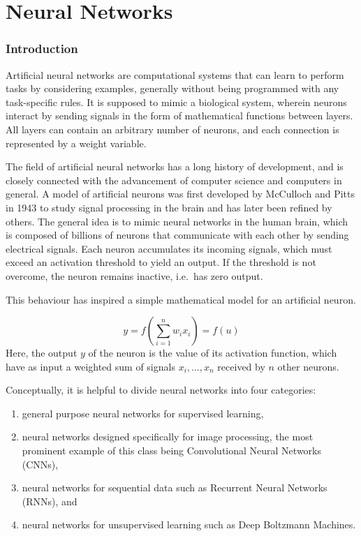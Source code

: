 
\chapter{Neural Networks}

\subsection*{Introduction}

Artificial neural networks are computational systems that can learn to
perform tasks by considering examples, generally without being
programmed with any task-specific rules. It is supposed to mimic a
biological system, wherein neurons interact by sending signals in the
form of mathematical functions between layers. All layers can contain
an arbitrary number of neurons, and each connection is represented by
a weight variable.

The field of artificial neural networks has a long history of
development, and is closely connected with the advancement of computer
science and computers in general. A model of artificial neurons was
first developed by McCulloch and Pitts in 1943 to study signal
processing in the brain and has later been refined by others. The
general idea is to mimic neural networks in the human brain, which is
composed of billions of neurons that communicate with each other by
sending electrical signals.  Each neuron accumulates its incoming
signals, which must exceed an activation threshold to yield an
output. If the threshold is not overcome, the neuron remains inactive,
i.e.~has zero output.

This behaviour has inspired a simple mathematical model for an artificial neuron.

\begin{equation}
 y = f\left(\sum_{i=1}^n w_ix_i\right) = f(u)
 \label{artificialNeuron}
\end{equation}
Here, the output $y$ of the neuron is the value of its activation function, which have as input
a weighted sum of signals $x_i, \dots ,x_n$ received by $n$ other neurons.

Conceptually, it is helpful to divide neural networks into four
categories:
\begin{enumerate}
\item general purpose neural networks for supervised learning,

\item neural networks designed specifically for image processing, the most prominent example of this class being Convolutional Neural Networks (CNNs),

\item neural networks for sequential data such as Recurrent Neural Networks (RNNs), and

\item neural networks for unsupervised learning such as Deep Boltzmann Machines.
\end{enumerate}

